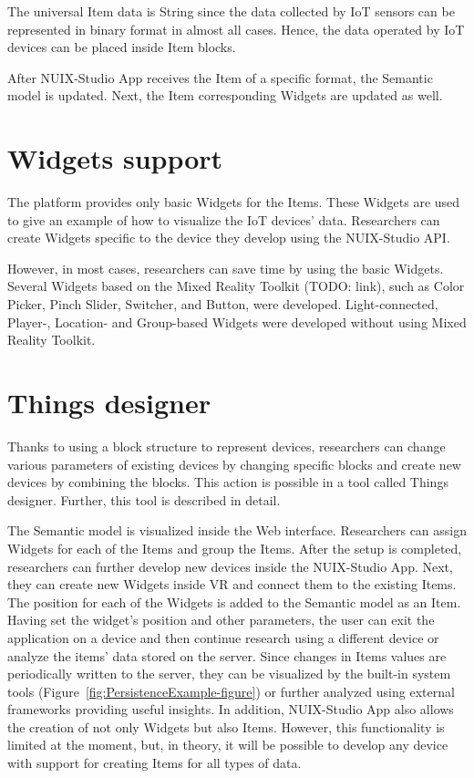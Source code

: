 The universal Item data is String since the data collected by IoT sensors can be represented in binary format in almost all cases. Hence, the data operated by IoT devices can be placed inside Item blocks.

After NUIX-Studio App receives the Item of a specific format, the Semantic model is updated. Next, the Item corresponding Widgets are updated as well.

\section{Widgets support}

The platform provides only basic Widgets for the Items. These Widgets are used to give an example of how to visualize the IoT devices' data. Researchers can create Widgets specific to the device they develop using the NUIX-Studio API.

However, in most cases, researchers can save time by using the basic Widgets. Several Widgets based on the Mixed Reality Toolkit (TODO: link), such as Color Picker, Pinch Slider, Switcher, and Button, were developed. Light-connected, Player-, Location- and Group-based Widgets were developed without using Mixed Reality Toolkit.

\section{Things designer}

Thanks to using a block structure to represent devices, researchers can change various parameters of existing devices by changing specific blocks and create new devices by combining the blocks. This action is possible in a tool called Things designer. Further, this tool is described in detail.

The Semantic model is visualized inside the Web interface. Researchers can assign Widgets for each of the Items and group the Items. After the setup is completed, researchers can further develop new devices inside the NUIX-Studio App. Next, they can create new Widgets inside VR and connect them to the existing Items. The position for each of the Widgets is added to the Semantic model as an Item. Having set the widget's position and other parameters, the user can exit the application on a device and then continue research using a different device or analyze the items' data stored on the server. Since changes in Items values are periodically written to the server, they can be visualized by the built-in system tools (Figure~\ref{fig:PersistenceExample-figure}) or further analyzed using external frameworks providing useful insights. In addition, NUIX-Studio App also allows the creation of not only Widgets but also Items. However, this functionality is limited at the moment, but, in theory, it will be possible to develop any device with support for creating Items for all types of data.

